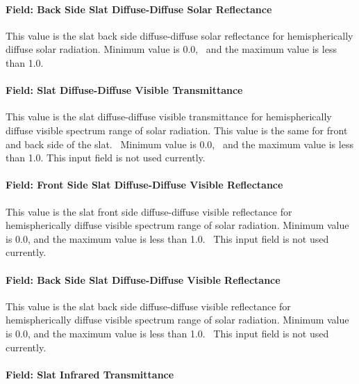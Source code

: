 \paragraph{Field: Back Side Slat Diffuse-Diffuse Solar Reflectance}\label{field-back-side-slat-diffuse-diffuse-solar-reflectance}

This value is the slat back side diffuse-diffuse solar reflectance for hemispherically diffuse solar radiation. Minimum value is 0.0,~ and the maximum value is less than 1.0.

\paragraph{Field: Slat Diffuse-Diffuse Visible Transmittance}\label{field-slat-diffuse-diffuse-visible-transmittance}

This value is the slat diffuse-diffuse visible transmittance for hemispherically diffuse visible spectrum range of solar radiation. This value is the same for front and back side of the slat.~ Minimum value is 0.0,~ and the maximum value is less than 1.0. This input field is not used currently.

\paragraph{Field: Front Side Slat Diffuse-Diffuse Visible Reflectance}\label{field-front-side-slat-diffuse-diffuse-visible-reflectance}

This value is the slat front side diffuse-diffuse visible reflectance for hemispherically diffuse visible spectrum range of solar radiation. Minimum value is 0.0, and the maximum value is less than 1.0.~ This input field is not used currently.

\paragraph{Field: Back Side Slat Diffuse-Diffuse Visible Reflectance}\label{field-back-side-slat-diffuse-diffuse-visible-reflectance}

This value is the slat back side diffuse-diffuse visible reflectance for hemispherically diffuse visible spectrum range of solar radiation. Minimum value is 0.0, and the maximum value is less than 1.0.~ This input field is not used currently.

\paragraph{Field: Slat Infrared Transmittance}\label{field-slat-Infrared-transmittance}


